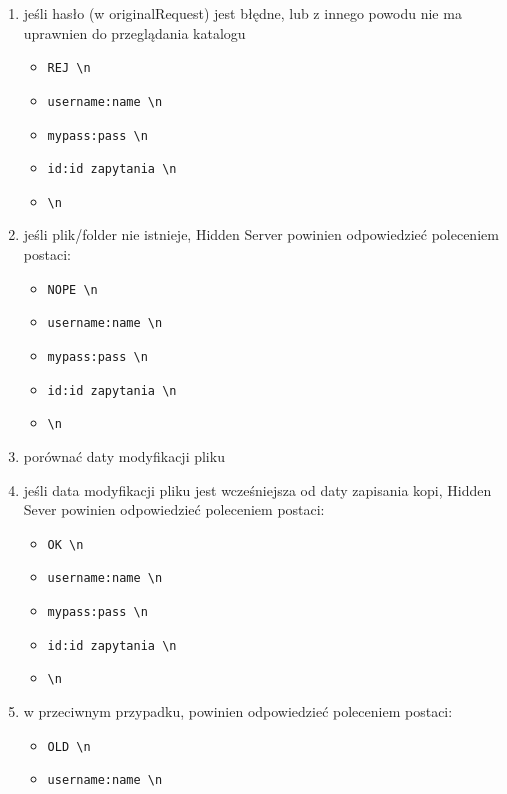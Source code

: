 \documentclass[a4paper,notitlepage]{article}
\begin{document}
\begin{enumerate}
    \item jeśli hasło (w originalRequest) jest błędne, lub z innego powodu nie ma uprawnien do przeglądania katalogu
    \begin{itemize}   
        \item \texttt{REJ \textbackslash n}
        \item \texttt{username:name \textbackslash n}
        \item \texttt{mypass:pass \textbackslash n}
        \item \texttt{id:id zapytania \textbackslash n}
        \item \texttt{\textbackslash n}
    \end{itemize}
    \item jeśli plik/folder nie istnieje, Hidden Server powinien odpowiedzieć poleceniem postaci:
    \begin{itemize}   
        \item \texttt{NOPE \textbackslash n}
        \item \texttt{username:name \textbackslash n}
        \item \texttt{mypass:pass \textbackslash n}
        \item \texttt{id:id zapytania \textbackslash n}
        \item \texttt{\textbackslash n}
    \end{itemize}
    \item porównać daty modyfikacji pliku 
    \item jeśli data modyfikacji pliku jest wcześniejsza od daty zapisania kopi, Hidden Sever powinien odpowiedzieć poleceniem postaci:
    \begin{itemize}
        \item \texttt{OK \textbackslash n}
        \item \texttt{username:name \textbackslash n}
        \item \texttt{mypass:pass \textbackslash n}
        \item \texttt{id:id zapytania \textbackslash n}
        \item \texttt{\textbackslash n}
    \end{itemize}
    \item w przeciwnym przypadku, powinien odpowiedzieć poleceniem postaci:
    \begin{itemize}
        \item \texttt{OLD \textbackslash n}
        \item \texttt{username:name \textbackslash n}

\end{itemize}
\end{enumerate}
\end{document}
